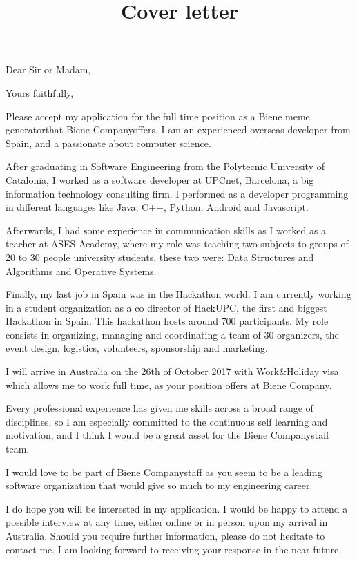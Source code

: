 \documentclass[11pt,a4paper,sans]{moderncv}        %
\title{Cover letter}                               	%
\newcommand{\CompanyName}{Biene Company}
\newcommand{\CompanyAddress}{Bienilandia}
\newcommand{\CompanyPosition}{Biene meme generator}
\begin{document}
\recipient{\CompanyName\space Recruitment team}{\CompanyName\\\CompanyAddress\\Perth}
\opening{Dear Sir or Madam,}
\closing{Yours faithfully,}

\makelettertitle

\justify
Please accept my application for the full time position as a \CompanyPosition\space that \CompanyName\space offers. I am an experienced overseas developer from Spain, and a passionate about computer science.

\justify
After graduating in Software Engineering from the Polytecnic University of Catalonia, I worked as a software developer at UPCnet, Barcelona, a big information technology consulting firm. I performed as a developer programming in different languages like Java, C++, Python, Android and Javascript.

\justify
Afterwards, I had some experience in communication skills as I worked as a teacher at ASES Academy, where my role was teaching two subjects to groups of 20 to 30 people university students, these two were: Data Structures and Algorithms and Operative Systems.

\justify
Finally, my last job in Spain was in the Hackathon world. I am currently working in a student organization as a co director of HackUPC, the first and biggest Hackathon in Spain. This hackathon hosts around 700 participants. My role consists in organizing, managing and coordinating a team of 30 organizers, the event design, logistics, volunteers, sponsorship and marketing.

\justify
I will arrive in Australia on the 26th of October 2017 with Work\&Holiday visa which allows me to work full time, as your position offers at \CompanyName.

\justify
Every professional experience has given me skills across a broad range of disciplines, so I am especially committed to the continuous self learning and motivation, and I think I would be a great asset for the \CompanyName\space staff team.

\justify
I would love to be part of \CompanyName\space staff as you seem to be a leading software organization that would give so much to my engineering career.

\justify
I do hope you will be interested in my application. I would be happy to attend a possible interview at any time, either online or in person upon my arrival in Australia. Should you require further information, please do not hesitate to contact me. I am looking forward to receiving your response in the near future.

\makeletterclosing
\end{document}
